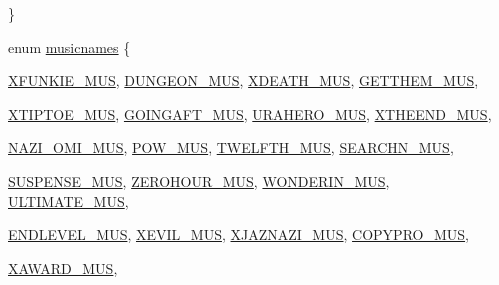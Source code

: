 \begin{DoxyCompactItemize}
 \}
\item 
enum \hyperlink{AUDIOWL6_8H_a196fbe29c4c02d90973f0b611ed0958b}{musicnames} \{ \par
\hyperlink{AUDIOSDM_8H_a196fbe29c4c02d90973f0b611ed0958ba5814081cce00028ae69647b5dd345951}{XFUNKIE\_\-MUS}, 
\hyperlink{AUDIOSDM_8H_a196fbe29c4c02d90973f0b611ed0958baf2c309188a930d785b5bd872cdc8a25a}{DUNGEON\_\-MUS}, 
\hyperlink{AUDIOSDM_8H_a196fbe29c4c02d90973f0b611ed0958ba31d3d22121778d7944d0cbb3a15f8a35}{XDEATH\_\-MUS}, 
\hyperlink{AUDIOSDM_8H_a196fbe29c4c02d90973f0b611ed0958ba7e5c1b99c21692e63e02afdd5d86fcc3}{GETTHEM\_\-MUS}, 
\par
\hyperlink{AUDIOSDM_8H_a196fbe29c4c02d90973f0b611ed0958bab60091442c550e0fa8c5168220b2a664}{XTIPTOE\_\-MUS}, 
\hyperlink{AUDIOSDM_8H_a196fbe29c4c02d90973f0b611ed0958bab65a27c2d6582c4939998558e0a6fe72}{GOINGAFT\_\-MUS}, 
\hyperlink{AUDIOSDM_8H_a196fbe29c4c02d90973f0b611ed0958ba7a71704b46eb8baaa32e6f817634328d}{URAHERO\_\-MUS}, 
\hyperlink{AUDIOSDM_8H_a196fbe29c4c02d90973f0b611ed0958bacd074c123bd5287a56231eed8de8debc}{XTHEEND\_\-MUS}, 
\par
\hyperlink{AUDIOSDM_8H_a196fbe29c4c02d90973f0b611ed0958baad2b095ea29bcfbfa15624151493269a}{NAZI\_\-OMI\_\-MUS}, 
\hyperlink{AUDIOSDM_8H_a196fbe29c4c02d90973f0b611ed0958ba1140f70dfce3db4d83fe3038e18ff81b}{POW\_\-MUS}, 
\hyperlink{AUDIOSDM_8H_a196fbe29c4c02d90973f0b611ed0958ba2daba453f800e809bfb4fca6124da377}{TWELFTH\_\-MUS}, 
\hyperlink{AUDIOSDM_8H_a196fbe29c4c02d90973f0b611ed0958ba1e10f75019002e7b968d610c22a3e34e}{SEARCHN\_\-MUS}, 
\par
\hyperlink{AUDIOSDM_8H_a196fbe29c4c02d90973f0b611ed0958baf8b8c2e5fd53c2af30daad5e3d760183}{SUSPENSE\_\-MUS}, 
\hyperlink{AUDIOSDM_8H_a196fbe29c4c02d90973f0b611ed0958ba23bd2ae74596af28fba6d2359f7128ed}{ZEROHOUR\_\-MUS}, 
\hyperlink{AUDIOSDM_8H_a196fbe29c4c02d90973f0b611ed0958ba68dd0b02bfbae87a0473618dc62c8162}{WONDERIN\_\-MUS}, 
\hyperlink{AUDIOSDM_8H_a196fbe29c4c02d90973f0b611ed0958babf66e8d94ebad353f9601202c45f2acc}{ULTIMATE\_\-MUS}, 
\par
\hyperlink{AUDIOSDM_8H_a196fbe29c4c02d90973f0b611ed0958ba2073820e6efb1330c3f9907a9c135032}{ENDLEVEL\_\-MUS}, 
\hyperlink{AUDIOSDM_8H_a196fbe29c4c02d90973f0b611ed0958ba255de5349523836b522f519e2eb2bbed}{XEVIL\_\-MUS}, 
\hyperlink{AUDIOSDM_8H_a196fbe29c4c02d90973f0b611ed0958baba8c50d5169ab80cd1c21de31bbe81f7}{XJAZNAZI\_\-MUS}, 
\hyperlink{AUDIOSDM_8H_a196fbe29c4c02d90973f0b611ed0958ba51178a1c921c6040e059112b2013d306}{COPYPRO\_\-MUS}, 
\par
\hyperlink{AUDIOSDM_8H_a196fbe29c4c02d90973f0b611ed0958ba95d7811735729ea881ff4e78494ce67d}{XAWARD\_\-MUS}, 

\end{DoxyCompactItemize}
